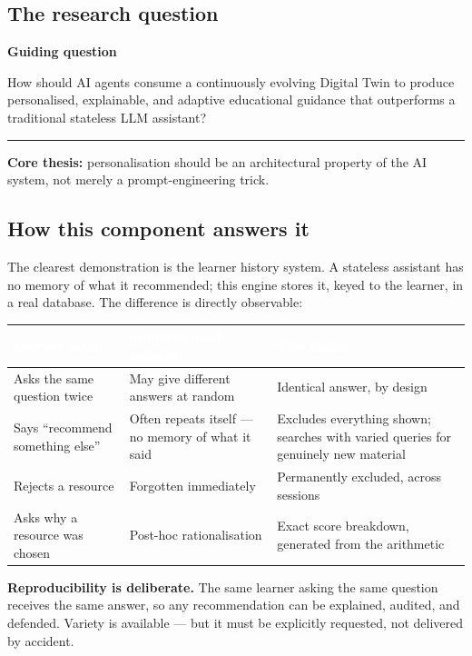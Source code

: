 \documentclass[11pt,a4paper]{article}
\newenvironment{callout}[1]
  {\par\vspace{8pt}\noindent
   \begin{lrbox}{\calloutbox}
   \begin{minipage}{\dimexpr\textwidth-2\fboxsep-8pt\relax}
   \vspace{4pt}
   {\bfseries\color{navy}#1}\par\vspace{4pt}}
  {\vspace{4pt}\end{minipage}%
   \end{lrbox}%
   \noindent\textcolor{navy}{\rule[-\dp\calloutbox]{3pt}{\dimexpr\ht\calloutbox+\dp\calloutbox\relax}}%
   \colorbox{headshade}{\usebox{\calloutbox}}%
   \par\vspace{10pt}}
\newcommand{\thead}[1]{\textcolor{white}{\bfseries\small #1}}
\newcommand{\headrow}{\rowcolor{navy}}
\begin{document}
\subsection{The research question}

\begin{callout}{Guiding question}
How should AI agents consume a continuously evolving Digital Twin to produce
personalised, explainable, and adaptive educational guidance that outperforms
a traditional stateless LLM assistant?
\end{callout}

\textbf{Core thesis:} personalisation should be an architectural property of
the AI system, not merely a prompt-engineering trick.

\subsection{How this component answers it}

The clearest demonstration is the learner history system. A stateless
assistant has no memory of what it recommended; this engine stores it, keyed
to the learner, in a real database. The difference is directly observable:

\vspace{4pt}
\begin{tabularx}{\textwidth}{>{\raggedright\arraybackslash}p{3.6cm} >{\raggedright\arraybackslash}X >{\raggedright\arraybackslash}X}
\headrow \thead{Learner action} & \thead{Stateless LLM assistant} & \thead{This engine} \\
\midrule
Asks the same question twice & May give different answers at random & Identical answer, by design \\
\rowcolor{altshade} Says ``recommend something else'' & Often repeats itself --- no memory of what it said & Excludes everything shown; searches with varied queries for genuinely new material \\
Rejects a resource & Forgotten immediately & Permanently excluded, across sessions \\
\rowcolor{altshade} Asks why a resource was chosen & Post-hoc rationalisation & Exact score breakdown, generated from the arithmetic \\
\bottomrule
\end{tabularx}
\vspace{8pt}

\textbf{Reproducibility is deliberate.} The same learner asking the same
question receives the same answer, so any recommendation can be explained,
audited, and defended. Variety is available --- but it must be explicitly
requested, not delivered by accident.
\end{document}
